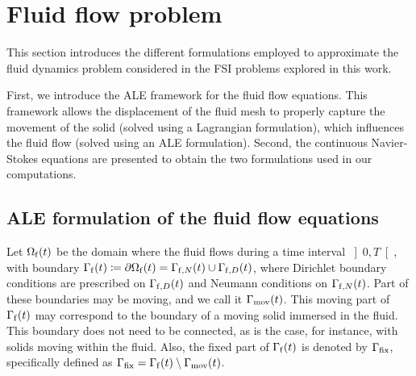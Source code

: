 \documentclass[11pt,english]{article}
\def\domainfluid{\Omega_{\rm{f}}}
\def\boundaryfluid{\Gamma_{\rm{f}}}
\def\timeint{\left ] 0,T\right[}                         %
\begin{document}

%
%
\section{Fluid flow problem} \label{sec:Fluid-flow-prob}

This section introduces the different formulations employed to approximate the fluid dynamics problem considered in the FSI problems explored in this work.

First, we introduce the ALE framework for the fluid flow equations. This framework allows the displacement of the fluid mesh to properly capture the movement of the solid (solved using a Lagrangian formulation), which influences the fluid flow (solved using an ALE formulation). Second, the continuous Navier-Stokes equations are presented to obtain the two formulations used in our computations.
%
%

\subsection{ALE formulation of the fluid flow equations}

Let $\domainfluid(t)$ be the domain where the fluid flows during a time interval $\timeint$, with boundary $\boundaryfluid(t) \coloneqq \partial\domainfluid(t) = \Gamma_{{\rm{f}},N}(t)\cup \Gamma_{{\rm{f}},D}(t)$, where Dirichlet boundary conditions are prescribed on $\Gamma_{{\rm{f}},D}(t)$ and Neumann conditions on $\Gamma_{{\rm{f}},N}(t)$. Part of these boundaries may be moving, and we call it $\Gamma_{\rm mov}(t)$. This moving part of $\boundaryfluid(t)$ may correspond to the boundary of a moving solid immersed in the fluid. This boundary does not need to be connected, as is the case, for instance, with solids moving within the fluid. Also, the fixed part of $\boundaryfluid(t)$ is denoted by $\Gamma_{\rm fix}$, specifically defined as $\Gamma_{\rm fix} = \boundaryfluid(t) \setminus \Gamma_{\rm mov}(t)$. 
\end{document}
